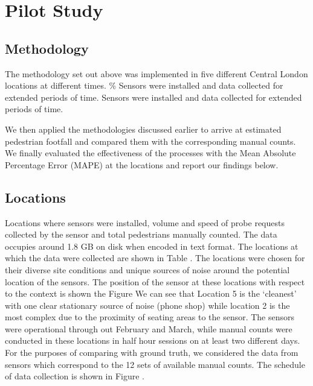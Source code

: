 \section{Pilot Study}

\subsection{Methodology}

The methodology set out above was implemented in five different Central London locations at different times.
\% Sensors were installed and data collected for extended periods of time.
Sensors were installed and data collected for extended periods of time.

We then applied the methodologies discussed earlier to arrive at estimated pedestrian footfall and compared them with the corresponding manual counts.
We finally evaluated the effectiveness of the processes with the Mean Absolute Percentage Error (MAPE) at the locations and report our findings below.


\subsection{Locations}

Locations where sensors were installed, volume and speed of probe requests collected by the sensor and total pedestrians manually counted.
The data occupies around 1.8 GB on disk when encoded in text format.
The locations at which the data were collected are shown in Table .
The locations were chosen for their diverse site conditions and unique sources of noise around the potential location of the sensors.
The position of the sensor at these locations with respect to the context is shown the Figure 
We can see that Location 5 is the `cleanest' with one clear stationary source of noise (phone shop) while location 2 is the most complex due to the proximity of seating areas to the sensor.
The sensors were operational through out February and March, while manual counts were conducted in these locations in half hour sessions on at least two different days.
For the purposes of comparing with ground truth, we considered the data from sensors which correspond to the 12 sets of available manual counts.
The schedule of data collection is shown in Figure .


